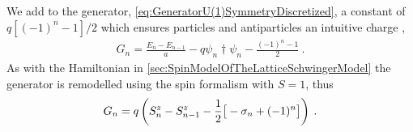 \documentclass[../main.tex]{subfiles} %
\begin{document}
We add to the generator, \cref{eq:GeneratorU(1)SymmetryDiscretized}, a constant of $q[(-1)^n - 1]/2$ which ensures particles and antiparticles an intuitive charge \cite{panyella_masterThesis_2019},
\begin{align} \label{eq:GeneratorWithExtraConstant}
    G_n = \frac{E_n - E_{n-1}}{a} - q \psi_n\dagger \psi_n - \frac{(-1)^n - 1}{2} \: .
\end{align}
As with the Hamiltonian in \cref{sec:SpinModelOfTheLatticeSchwingerModel} the generator is remodelled using the spin formalism with $S=1$, thus
\begin{align} \label{eq:GeneratorU(1)SymmetrySpinVersion} \index{generator!of U(1) symmetry!discretized!with spin}\index{generator!of U(1) symmetry}
    G_n = q \left( S_n^z - S_{n-1}^z - \frac{1}{2} \big[ - \sigma_n + (-1)^n \big] \right) \: .
\end{align}
%
\end{document}
